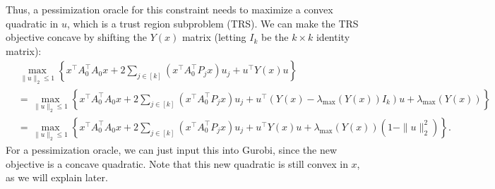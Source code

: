 \documentclass[11pt,oneside]{article}
\theoremstyle{plain}
\theoremstyle{definition}
\theoremstyle{remark}
\begin{document}
Thus, a pessimization oracle for this constraint needs to maximize a convex quadratic in $u$, which is a trust region subproblem (TRS). We can make the TRS objective concave by shifting the $Y(x)$ matrix (letting $I_k$ be the $k \times k$ identity matrix):
\begin{align*}
&\max_{\|u\|_2 \leq 1} \left\{ x^\top A_0^\top A_0 x + 2 \sum_{j \in [k]} (x^\top A_0^\top P_j x) u_j + u^\top Y(x) u \right\}\\
&= \max_{\|u\|_2 \leq 1} \left\{ x^\top A_0^\top A_0 x + 2 \sum_{j \in [k]} (x^\top A_0^\top P_j x) u_j + u^\top (Y(x) - \lambda_{\max}(Y(x)) I_k) u + \lambda_{\max}(Y(x)) \right\}\\
&= \max_{\|u\|_2 \leq 1} \left\{ x^\top A_0^\top A_0 x + 2 \sum_{j \in [k]} (x^\top A_0^\top P_j x) u_j + u^\top Y(x) u + \lambda_{\max}(Y(x))(1 - \|u\|_2^2) \right\}.
\end{align*}
For a pessimization oracle, we can just input this into Gurobi, since the new objective is a concave quadratic. Note that this new quadratic is still convex in $x$, as we will explain later.
\end{document}
